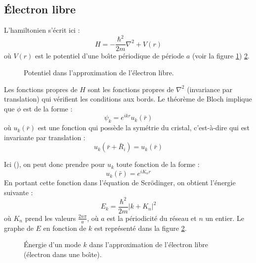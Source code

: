 \documentclass[12pt]{book}
\begin{document}
\subsection{\'Electron libre}
L'hamiltonien s'\'ecrit\cite{ph:solid:Kittel67,ph:solid:Callaway64}
ici : 
\begin{equation}
H=-\frac{\hbar^2}{2m}\nabla^2+V(r)
\end{equation}
o\`u $V(r)$ est le potentiel d'une bo\^\i te p\'eriodique de p\'eriode $a$
(voir la figure \ref{figpotperioboit})
\ref{figeneeleclib}. 
\begin{figure}[htb]
 \centerline{}   
 \caption{Potentiel dans l'approximation de l'\'electron libre.}
 \label{figpotperioboit}
\end{figure}
Les fonctions propres de $H$ sont les fonctions propres de $\nabla^2$
(invariance par translation) qui v\'erifient les conditions aux bords.
Le th\'eor\`eme de Bloch implique que $\phi$ est de la forme :
\begin{equation}
\psi_k=e^{ikr}u_k(\bar{r})
\end{equation}
o\`u  $u_k(\bar{r})$ est une fonction qui poss\`ede la sym\'etrie du
cristal, c'est-\`a-dire qui est invariante par
translation : 
\begin{equation}
u_k(\bar{r}+\bar{R}_i)=u_k(\bar{r})
\end{equation}

Ici (\cite{ph:solid:Callaway64}), on peut donc prendre pour $u_k$
toute fonction de la forme :
\begin{equation}
u_k(\bar{r})=e^{iK_nr}
\end{equation}
En portant cette fonction dans l'\'equation de Scr\"odinger, on obtient
l'\'energie suivante : 
\begin{equation}
E_k=\frac{\hbar^2}{2m}|k+K_n|^2
\end{equation}
o\`u $K_n$ prend les valeurs $\frac{2n\pi}{a}$, o\`u $a$ est la
p\'eriodicit\'e du r\'eseau et $n$ un entier.
Le graphe de $E$ en fonction de $k$ est repr\'esent\'e dans la figure
\ref{figeneeleclib}. 
\begin{figure}[htb]
 \centerline{}   
 \caption{\'Energie d'un mode $k$ dans l'approximation de l'\'electron
libre (\'electron dans une bo\^\i te).}
 \label{figeneeleclib}
\end{figure}
\end{document}
